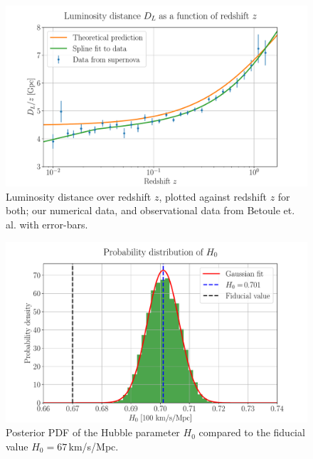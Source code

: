 \documentclass[%
reprint,
 amsmath,amssymb,
 aps,
]{revtex4-2}
\begin{document}
\begin{figure}[ht!]
	\includegraphics[width = \linewidth]{Figures/LumiDistance.pdf}
	\caption{Luminosity distance over redshift $z$, plotted against redshift $z$ for both; our numerical data, and observational data from Betoule et. al. \cite{SDSS:2014iwm} with error-bars.}
	\label{fig:LumiDistance}
\end{figure}
\begin{figure}[ht!]
\includegraphics[width = \linewidth]{Figures/PDEh.pdf}
\caption{Posterior PDF of the Hubble parameter $H_0$ compared to the fiducial value $H_0=67\,$km/s/Mpc.}
\label{fig:PDEh}
\end{figure}
\end{document}

